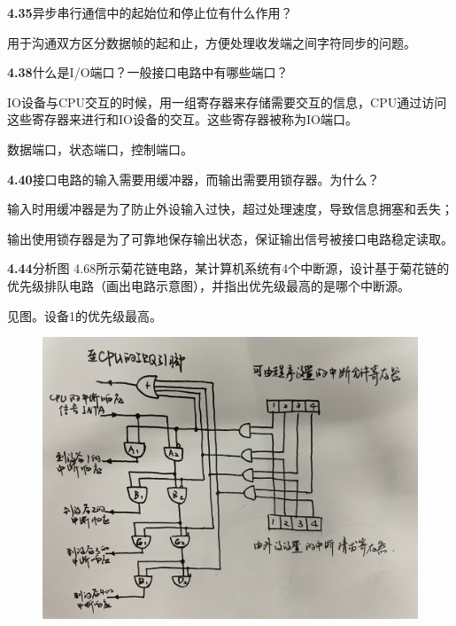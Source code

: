 \documentclass{article}
\begin{document}
    \noindent\textbf{4.35}异步串行通信中的起始位和停止位有什么作用？\par
    用于沟通双方区分数据帧的起和止，方便处理收发端之间字符同步的问题。
    \\[4pt]\par

    \noindent\textbf{4.38}什么是I/O端口？一般接口电路中有哪些端口？\par
    IO设备与CPU交互的时候，用一组寄存器来存储需要交互的信息，CPU通过访问这些寄存器来进行和IO设备的交互。这些寄存器被称为IO端口。\par
    数据端口，状态端口，控制端口。
    \\[4pt]\par

    \noindent\textbf{4.40}接口电路的输入需要用缓冲器，而输出需要用锁存器。为什么？\par
    输入时用缓冲器是为了防止外设输入过快，超过处理速度，导致信息拥塞和丢失；\par
    输出使用锁存器是为了可靠地保存输出状态，保证输出信号被接口电路稳定读取。
    \\[4pt]\par

    \noindent\textbf{4.44}分析图 4.68所示菊花链电路，某计算机系统有4个中断源，设计基于菊花链的优先级排队电路（画出电路示意图），并指出优先级最高的是哪个中断源。\par
    见图。设备1的优先级最高。
    \begin{figure}[h]
        \centering
        \includegraphics[scale=0.09]{IMG_0909.jpg}
    \end{figure}
    \\[4pt]\par
\end{document}
